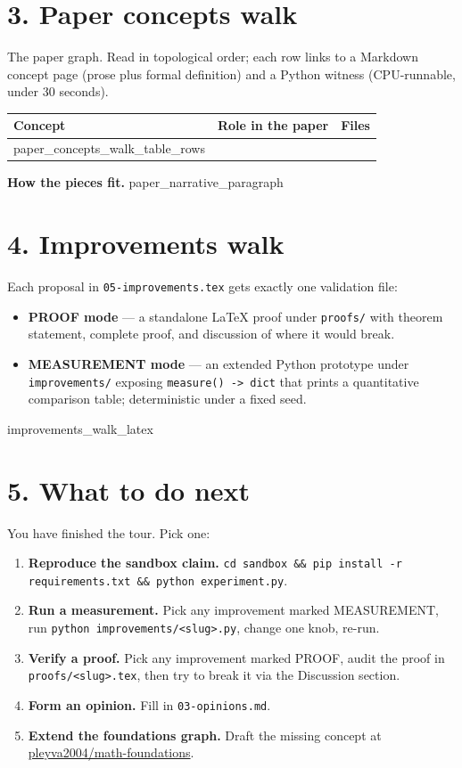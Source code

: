 \documentclass[11pt]{article}
\begin{document}
\section*{3. Paper concepts walk}

The paper graph. Read in topological order; each row links to a Markdown concept page (prose plus formal definition) and a Python witness (CPU-runnable, under 30 seconds).

\begin{longtable}{p{} p{} p{}}
\toprule
\textbf{Concept} & \textbf{Role in the paper} & \textbf{Files} \\
\midrule
\endhead
\bottomrule
\endfoot
{{paper_concepts_walk_table_rows}} \\
\end{longtable}

\noindent\textbf{How the pieces fit.} {{paper_narrative_paragraph}}

\section*{4. Improvements walk}

Each proposal in \texttt{05-improvements.tex} gets exactly one validation file:
\begin{itemize}[leftmargin=*]
  \item \textbf{PROOF mode} --- a standalone LaTeX proof under \texttt{proofs/} with theorem statement, complete proof, and discussion of where it would break.
  \item \textbf{MEASUREMENT mode} --- an extended Python prototype under \texttt{improvements/} exposing \texttt{measure() -> dict} that prints a quantitative comparison table; deterministic under a fixed seed.
\end{itemize}

{{improvements_walk_latex}}

\section*{5. What to do next}

You have finished the tour. Pick one:
\begin{enumerate}[leftmargin=*]
  \item \textbf{Reproduce the sandbox claim.} \texttt{cd sandbox \&\& pip install -r requirements.txt \&\& python experiment.py}.
  \item \textbf{Run a measurement.} Pick any improvement marked MEASUREMENT, run \texttt{python improvements/<slug>.py}, change one knob, re-run.
  \item \textbf{Verify a proof.} Pick any improvement marked PROOF, audit the proof in \texttt{proofs/<slug>.tex}, then try to break it via the Discussion section.
  \item \textbf{Form an opinion.} Fill in \texttt{03-opinions.md}.
  \item \textbf{Extend the foundations graph.} Draft the missing concept at \href{https://github.com/pleyva2004/math-foundations}{pleyva2004/math-foundations}.
\end{enumerate}
\end{document}
